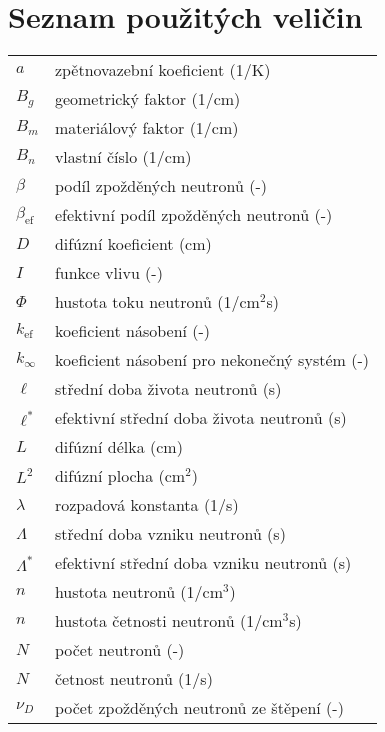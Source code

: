 \section*{Seznam použitých veličin}

\renewcommand{\arraystretch}{1.2}
\begin{table}[H]
\begin{tabular}{p{1cm}l}
  $a$             & zpětnovazební koeficient (1/K) \\
  $B_g$           & geometrický faktor (1/cm) \\
  $B_m$           & materiálový faktor (1/cm) \\
  $B_n$           & vlastní číslo (1/cm) \\
  $\beta$         & podíl zpožděných neutronů (-) \\
  $\beta_{\text{ef}}$  & efektivní podíl zpožděných neutronů (-) \\
  $D$             & difúzní koeficient (cm) \\
  $I$             & funkce vlivu (-) \\
  $\Phi$          & hustota toku neutronů (1/cm$^2$s) \\
  $k_{\text{ef}}$ & koeficient násobení (-) \\
  $k_{\infty}$    & koeficient násobení pro nekonečný systém (-) \\
  $\ell$          & střední doba života neutronů (s) \\
  $\ell^*$        & efektivní střední doba života neutronů (s) \\
  $L$             & difúzní délka (cm) \\
  $L^2$           & difúzní plocha (cm$^2$) \\
  $\lambda$       & rozpadová konstanta (1/s) \\
  $\Lambda$       & střední doba vzniku neutronů (s) \\
  $\Lambda^*$     & efektivní střední doba vzniku neutronů (s) \\
  $n$             & hustota neutronů (1/cm$^3$) \\
  $n$             & hustota četnosti neutronů (1/cm$^3$s) \\
  $N$             & počet neutronů (-) \\
  $N$             & četnost neutronů (1/s) \\
  $\nu_D$         & počet zpožděných neutronů ze štěpení (-) \\

\end{tabular}
\end{table}
